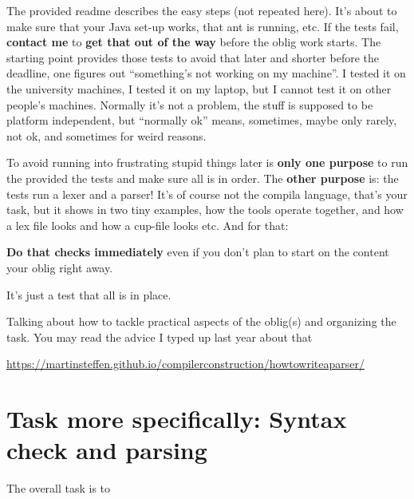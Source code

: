 \documentclass[10pt,freeform]{handout}[2014/08/13]
\begin{document}
The provided readme describes the easy steps (not repeated here). It's
about to make sure that your Java set-up works, that ant is running,
etc. If the tests fail, \textbf{contact me} to \textbf{get that out of the
  way} before the oblig work starts. The starting point provides those
tests to avoid that later and shorter before the deadline, one figures out
``something's not working on my machine''. I tested it on the university
machines, I tested it on my laptop, but I cannot test it on other people's
machines.  Normally it's not a problem, the stuff is supposed to be
platform independent, but ``normally ok'' means, sometimes, maybe only
rarely, not ok, and sometimes for weird reasons.

To avoid running into frustrating stupid things later is \textbf{only one
  purpose} to run the provided the tests and make sure all is in order. The
\textbf{other purpose} is: the tests run a lexer and a parser!  It's of
course not the compila language, that's your task, but it shows in two tiny
examples, how the tools operate together, and how a lex file looks and how
a cup-file looks etc. And for that:

\begin{center}
  \textbf{Do that checks immediately} even if you don't plan to start on
  the content your oblig right away.
\end{center}
It's just a test that all is in place.

Talking about how to tackle practical aspects of the oblig(s) and
organizing the task. You may read the advice I typed up last year about that

\begin{center}
  \url{https://martinsteffen.github.io/compilerconstruction/howtowriteaparser/}
\end{center}





\section{Task more specifically: Syntax check and parsing}
\label{sec:task-more-spec}


The overall task is to 
\end{document}
